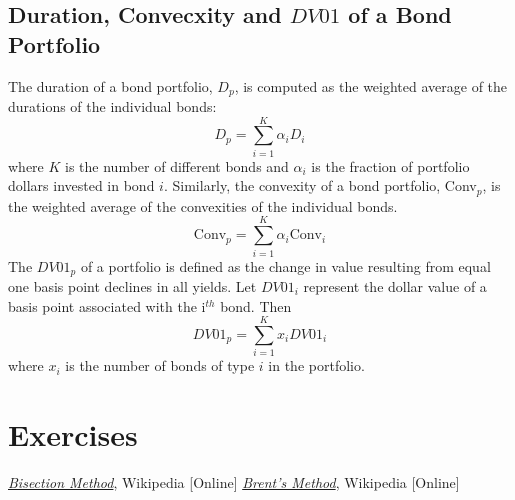 \subsection{Duration, Convecxity and $DV01$ of a Bond Portfolio}
The duration of a bond portfolio, $D_p$, is computed as the weighted average of the durations of the individual
bonds:
\begin{equation}
D_p = \sum_{i=1}^{K} \alpha_i D_i
\end{equation}
where $K$ is the number of different bonds and $\alpha_i$ is the fraction of portfolio dollars invested in bond $i$. Similarly, the convexity of a bond portfolio, Conv$_p$, is the weighted average of the convexities of the individual bonds.
\begin{equation}
\textrm{Conv}_p = \sum^{K}_{i=1} \alpha_i \textrm{Conv}_i
\end{equation}
The $DV01_p$ of a portfolio is defined as the change in value resulting from equal one basis point declines in all yields. Let $DV01_i$ represent the dollar value of a basis point associated with the i$^{th}$ bond. Then
\begin{equation}
DV01_p = \sum^{K}_{i=1}x_i DV01_i
\end{equation}
where $x_i$ is the number of bonds of type $i$ in the portfolio.

\section*{Exercises}


\begin{thebibliography}{9}
	\href{https://en.wikipedia.org/wiki/Bisection_method}{\emph{Bisection Method}}, Wikipedia [Online]
	 \href{https://en.wikipedia.org/wiki/Brent%27s_method}{\emph{Brent's Method}}, Wikipedia [Online]
\end{thebibliography}
